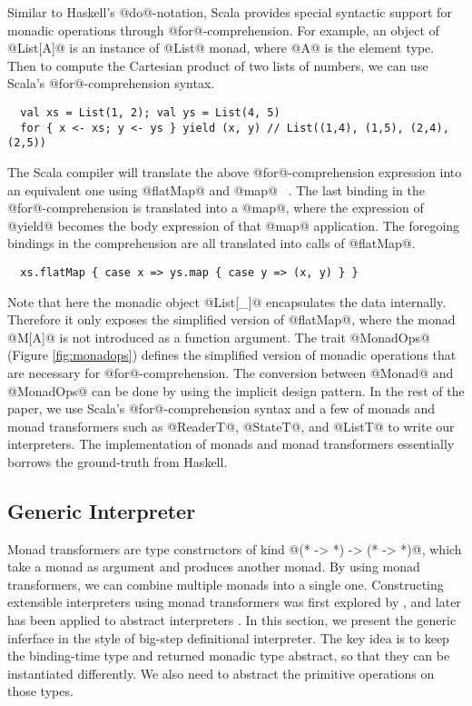 Similar to Haskell's @do@-notation, Scala provides special syntactic support for
monadic operations through @for@-comprehension.
For example, an object of @List[A]@ is an instance of @List@ monad, where @A@ is the element type. 
Then to compute the Cartesian product of two lists of numbers, we can use Scala's
@for@-comprehension syntax.

\begin{lstlisting}
  val xs = List(1, 2); val ys = List(4, 5)
  for { x <- xs; y <- ys } yield (x, y) // List((1,4), (1,5), (2,4), (2,5))
\end{lstlisting}

The Scala compiler will translate the above @for@-comprehension expression into
an equivalent one using @flatMap@ and @map@ ~\cite{scala_spec}. The last binding
in the @for@-comprehension is translated into a @map@, where the expression of
@yield@ becomes the body expression of that @map@ application. The foregoing
bindings in the comprehension are all translated into calls of @flatMap@.

\begin{lstlisting}
  xs.flatMap { case x => ys.map { case y => (x, y) } }
\end{lstlisting}

Note that here the monadic object @List[_]@ encapsulates the data
internally.  Therefore it only exposes the simplified version of
@flatMap@, where the monad @M[A]@ is not introduced as a function
argument. The trait @MonadOps@ (Figure \ref{fig:monadops}) defines the
simplified version of monadic operations that are necessary for
@for@-comprehension. The conversion between @Monad@ and @MonadOps@
can be done by using the implicit design pattern.
In the rest of the paper, we use Scala's @for@-comprehension syntax
and a few of monads and monad transformers such as @ReaderT@,
@StateT@, and @ListT@ to write our interpreters. The implementation
of monads and monad transformers essentially borrows the ground-truth
from Haskell.

\subsection{Generic Interpreter} \label{generic_if}

Monad transformers are type constructors of kind @(* -> *) -> (* -> *)@, which
take a monad as argument and produces another monad. By using monad
transformers, we can combine multiple monads into a single one. Constructing
extensible interpreters using monad transformers was first explored by
\citet{DBLP:conf/popl/LiangHJ95}, and later has been applied to abstract
interpreters \cite{Sergey:2013:MAI:2491956.2491979,
  DBLP:journals/pacmpl/DaraisLNH17, Darais:2015:GTM:2814270.2814308}.
In this section, we present the generic inferface in the style of big-step
definitional interpreter. The key idea is to keep the binding-time type and
returned monadic type abstract, so that they can be instantiated differently.
We also need to abstract the primitive operations on those types.

